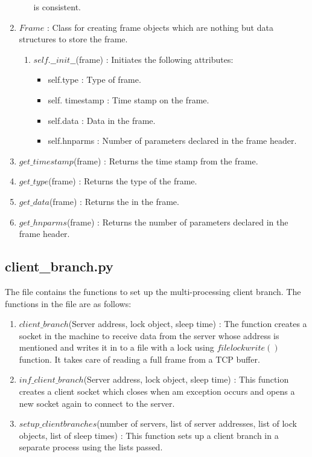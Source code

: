 \begin{enumerate}
\begin{enumerate}
				is consistent.
		\end{enumerate}
	\item $Frame$ : Class for creating frame objects which are nothing but data
		structures to store the frame.
		\begin{enumerate}
			\item $self.\_\_init\_\_$(frame) : Initiates the following attributes:
				\begin{itemize}
					\item self.type : Type of frame.
					\item self. timestamp : Time stamp on the frame.
					\item self.data : Data in the frame.
					\item self.hnparms : Number of parameters declared in the
						frame header.
				\end{itemize}
		\end{enumerate}
	\item $get\_timestamp$(frame) : Returns the time stamp from the frame.
	\item $get\_type$(frame) : Returns the type of the frame.
	\item $get\_data$(frame) : Returns the in the frame.
	\item $get\_hnparms$(frame) : Returns the number of parameters declared in
		the frame header.
\end{enumerate}


\subsection{client\_branch.py}
The file contains the functions to set up the multi-processing client branch.
The functions in the file are as follows:
\begin{enumerate}
	\item $client\_branch$(Server address, lock object, sleep time) : The
		function creates a socket in the machine to receive data from the
		server whose address is mentioned and writes it in to a file with a
		lock using $filelockwrite()$ function. It takes care of reading a full
		frame from a TCP buffer.
	\item $inf\_client\_branch$(Server address, lock object, sleep time) : This
		function creates a client socket which closes when am exception occurs
		and opens a new socket again to connect to the server.
	\item $setup\_clientbranches$(number of servers, list of server addresses,
		list of lock objects, list of sleep times) : This function sets up a
		client branch in a separate process using the lists passed.
\end{enumerate}


